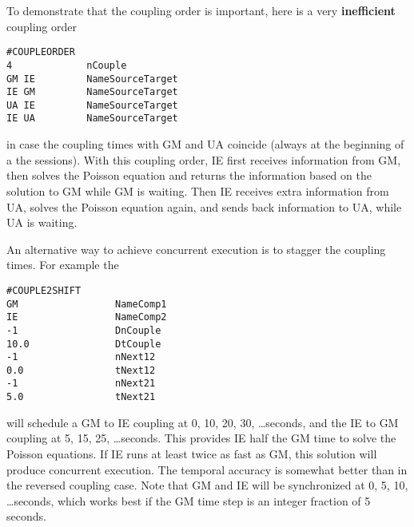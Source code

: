 To demonstrate that the coupling order is important, here
is a very {\bf inefficient} coupling order
\begin{verbatim}
#COUPLEORDER
4             nCouple	  
GM IE         NameSourceTarget
IE GM         NameSourceTarget
UA IE         NameSourceTarget
IE UA         NameSourceTarget
\end{verbatim}
in case the coupling times with GM and UA coincide (always at the beginning
of a the sessions).
With this coupling order, IE first receives information from GM,
then solves the Poisson equation and returns the information based
on the solution to GM while GM is waiting. Then IE receives extra
information from UA, solves the Poisson equation again, and sends
back information to UA, while UA is waiting. 

An alternative way to achieve concurrent execution is to
stagger the coupling times. For example the
\begin{verbatim}
#COUPLE2SHIFT
GM                 NameComp1
IE                 NameComp2
-1                 DnCouple
10.0               DtCouple
-1                 nNext12
0.0                tNext12
-1                 nNext21
5.0                tNext21
\end{verbatim}
will schedule a GM to IE coupling at 0, 10, 20, 30, \ldots seconds,
and the IE to GM coupling at 5, 15, 25, \ldots seconds.
This provides IE half the GM time to solve the Poisson equations.
If IE runs at least twice as fast as GM, this solution will
produce concurrent execution. The temporal accuracy is
somewhat better than in the reversed coupling case.
Note that GM and IE will be synchronized at 0, 5, 10, \ldots seconds,
which works best if the GM time step is an integer fraction of 5 seconds.
